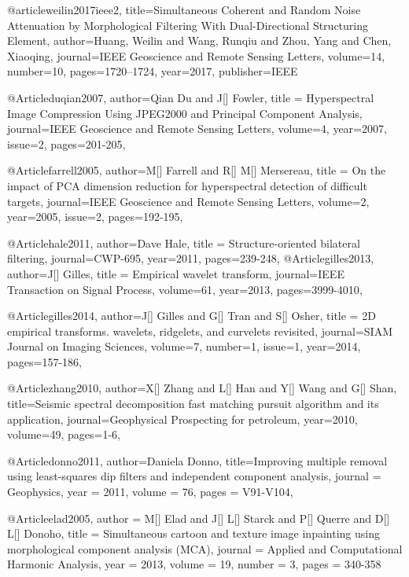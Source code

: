 {@article{weilin2017ieee2,
  title={Simultaneous Coherent and Random Noise Attenuation by Morphological Filtering With Dual-Directional Structuring Element},
  author={Huang, Weilin and Wang, Runqiu and Zhou, Yang and Chen, Xiaoqing},
  journal={IEEE Geoscience and Remote Sensing Letters},
  volume={14},
  number={10},
  pages={1720--1724},
  year={2017},
  publisher={IEEE}
}



@Article{duqian2007,
  author={Qian Du and J[] Fowler},
  title = {Hyperspectral Image Compression Using JPEG2000 and Principal Component Analysis},
  journal={IEEE Geoscience and Remote Sensing Letters},
  volume={4},
  year=2007,
  issue=2,
  pages={201-205},
}

@Article{farrell2005,
  author={M[] Farrell and R[] M[] Mersereau},
  title = {On the impact of PCA dimension reduction for hyperspectral detection of difficult targets},
  journal={IEEE Geoscience and Remote Sensing Letters},
  volume={2},
  year=2005,
  issue=2,
  pages={192-195},
}




@Article{hale2011,
  author={Dave Hale},
  title = {Structure-oriented bilateral filtering},
  journal={CWP-695},
  year=2011,
  pages={239-248},
}
@Article{gilles2013,
  author={J[] Gilles},
  title = {Empirical wavelet transform},
  journal={IEEE Transaction on Signal Process},
  volume={61},
  year=2013,
  pages={3999-4010},
}

@Article{gilles2014,
  author={J[] Gilles and G[] Tran and S[] Osher},
  title = {2D empirical transforms. wavelets, ridgelets, and curvelets revisited},
  journal={SIAM Journal on Imaging Sciences},
  volume={7},
  number=1,
  issue=1,
  year=2014,
  pages={157-186},
}




@Article{zhang2010,
  author={X[] Zhang and L[] Han and Y[] Wang and G[] Shan},
  title={Seismic spectral decomposition fast matching pursuit algorithm and its application},
  journal={Geophysical Prospecting for petroleum},
  year=2010,
  volume=49,
  pages={1-6},
}

@Article{donno2011,
  author={Daniela Donno},
  title={Improving multiple removal using least-squares dip filters
and independent component analysis},
  journal = 	 {Geophysics},
  year = 	 2011,
  volume =	 76,
  pages =	 {V91-V104},
}

@Article{elad2005,
  author = 	 {M[] Elad and J[] L[] Starck and P[] Querre and D[] L[] Donoho},
  title = 	 {Simultaneous cartoon and texture image inpainting using morphological component analysis (MCA)},
  journal = 	 {Applied and Computational Harmonic Analysis},
  year = 	 2013,
  volume = 	 19,
  number = 	 3,
  pages = 	 {340-358}}

}
